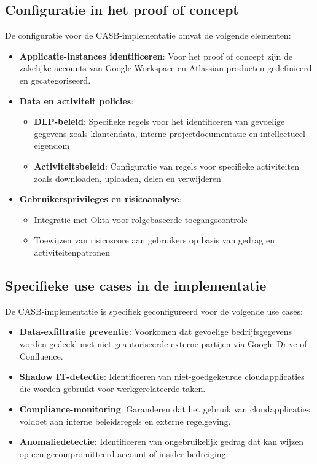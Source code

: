 \subsection{Configuratie in het proof of concept}

De configuratie voor de CASB-implementatie omvat de volgende elementen:

\begin{itemize}
    \item \textbf{Applicatie-instances identificeren}: Voor het proof of concept zijn de zakelijke accounts van Google Workspace en Atlassian-producten gedefinieerd en gecategoriseerd.

    \item \textbf{Data en activiteit policies}:
        \begin{itemize}
            \item \textbf{DLP-beleid}: Specifieke regels voor het identificeren van gevoelige gegevens zoals klantendata, interne projectdocumentatie en intellectueel eigendom
            \item \textbf{Activiteitsbeleid}: Configuratie van regels voor specifieke activiteiten zoals downloaden, uploaden, delen en verwijderen
        \end{itemize}

    \item \textbf{Gebruikersprivileges en risicoanalyse}:
        \begin{itemize}
            \item Integratie met Okta voor rolgebaseerde toegangscontrole
            \item Toewijzen van risicoscore aan gebruikers op basis van gedrag en activiteitenpatronen
        \end{itemize}
\end{itemize}
\subsection{Specifieke use cases in de implementatie}

De CASB-implementatie is specifiek geconfigureerd voor de volgende use cases:

\begin{itemize}
    \item \textbf{Data-exfiltratie preventie}: Voorkomen dat gevoelige bedrijfsgegevens worden gedeeld met niet-geautoriseerde externe partijen via Google Drive of Confluence.

    \item \textbf{Shadow IT-detectie}: Identificeren van niet-goedgekeurde cloudapplicaties die worden gebruikt voor werkgerelateerde taken.

    \item \textbf{Compliance-monitoring}: Garanderen dat het gebruik van cloudapplicaties voldoet aan interne beleidsregels en externe regelgeving.

    \item \textbf{Anomaliedetectie}: Identificeren van ongebruikelijk gedrag dat kan wijzen op een gecompromitteerd account of insider-bedreiging.
\end{itemize}

